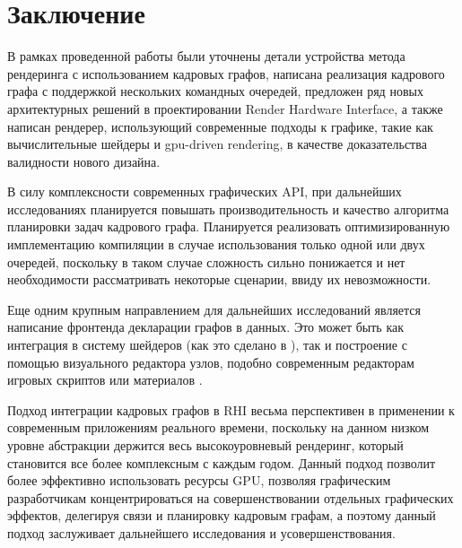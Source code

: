 \section{Заключение}
В рамках проведенной работы были уточнены детали устройства метода рендеринга с использованием кадровых графов, написана реализация кадрового графа с поддержкой нескольких командных очередей, предложен ряд новых архитектурных решений в проектировании Render Hardware Interface, а также написан рендерер, использующий современные подходы к графике, такие как вычислительные шейдеры и gpu-driven rendering, в качестве доказательства валидности нового дизайна.

В силу комплексности современных графических API, при дальнейших исследованиях планируется повышать производительность и качество алгоритма планировки задач кадрового графа. Планируется реализовать оптимизированную имплементацию компиляции в случае использования только одной или двух очередей, поскольку в таком случае сложность сильно понижается и нет необходимости рассматривать некоторые сценарии, ввиду их невозможности.

Еще одним крупным направлением для дальнейших исследований является написание фронтенда декларации графов в данных. Это может быть как интеграция в систему шейдеров (как это сделано в \cite{amd_rps_sdk}), так и построение с помощью визуального редактора узлов, подобно современным редакторам игровых скриптов или материалов \cite{material_editor_ue5}.

Подход интеграции кадровых графов в RHI весьма перспективен в применении к современным приложениям реального времени, поскольку на данном низком уровне абстракции держится весь высокоуровневый рендеринг, который становится все более комплексным с каждым годом. Данный подход позволит более эффективно использовать ресурсы GPU, позволяя графическим разработчикам концентрироваться на совершенствовании отдельных графических эффектов, делегируя связи и планировку кадровым графам, а поэтому данный подход заслуживает дальнейшего исследования и усовершенствования.